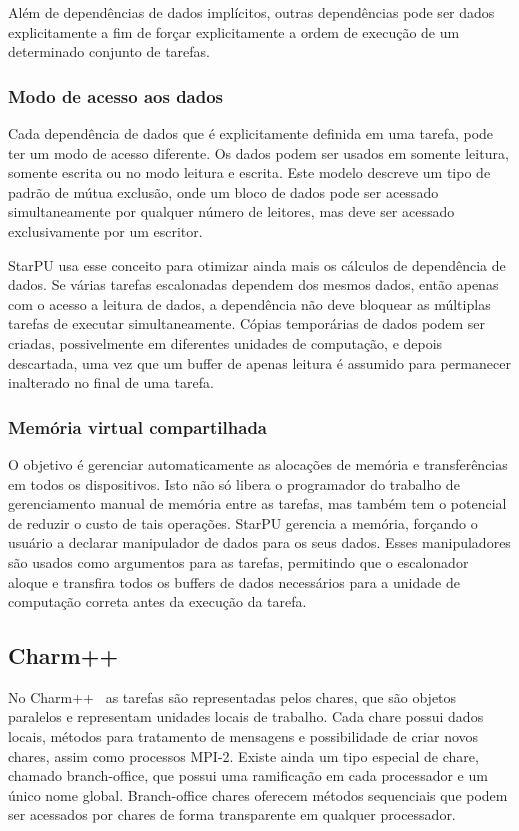 Além de dependências de dados implícitos, outras dependências pode ser dados explicitamente a fim de forçar explicitamente a ordem de execução de um determinado conjunto de tarefas.


\subsubsection{Modo de acesso aos dados}

Cada dependência de dados que é explicitamente definida em uma tarefa, pode ter um modo de acesso diferente. Os dados podem ser usados em somente leitura, somente escrita ou no modo leitura e escrita. Este modelo descreve um tipo de padrão de mútua exclusão, onde um bloco de dados pode ser acessado simultaneamente por qualquer número de leitores, mas deve ser acessado exclusivamente por um escritor. 

StarPU usa esse conceito para otimizar ainda mais os cálculos de dependência de dados. Se várias tarefas escalonadas dependem dos mesmos dados, então apenas com o acesso a leitura de dados, a dependência não deve bloquear as múltiplas tarefas de executar simultaneamente. Cópias temporárias de dados podem ser criadas, possivelmente em diferentes unidades de computação, e depois descartada, uma vez que um buffer de apenas leitura é assumido para permanecer inalterado no final de uma tarefa.

\subsubsection{Memória virtual compartilhada}

O objetivo é gerenciar automaticamente as alocações de memória e transferências em todos os dispositivos. Isto não só libera o programador do trabalho de gerenciamento manual de memória entre as tarefas, mas também tem o potencial de reduzir o custo de tais operações. StarPU gerencia a memória, forçando o usuário a declarar manipulador de dados para os seus dados. Esses manipuladores são usados como argumentos para as tarefas, permitindo que o escalonador aloque e transfira todos os buffers de dados necessários para a unidade de computação correta antes da execução da tarefa.


\subsection{Charm++}

No Charm++~\cite{kunzman2006charm++} as tarefas são representadas pelos chares, que são objetos paralelos e representam unidades locais de trabalho. Cada chare possui dados locais, métodos para tratamento de mensagens e possibilidade de criar novos chares, assim como processos MPI-2. Existe ainda um tipo especial de chare, chamado branch-office, que possui uma ramificação em cada processador e um único nome global. Branch-office chares oferecem métodos sequenciais que podem ser acessados por chares de forma transparente em qualquer processador.

